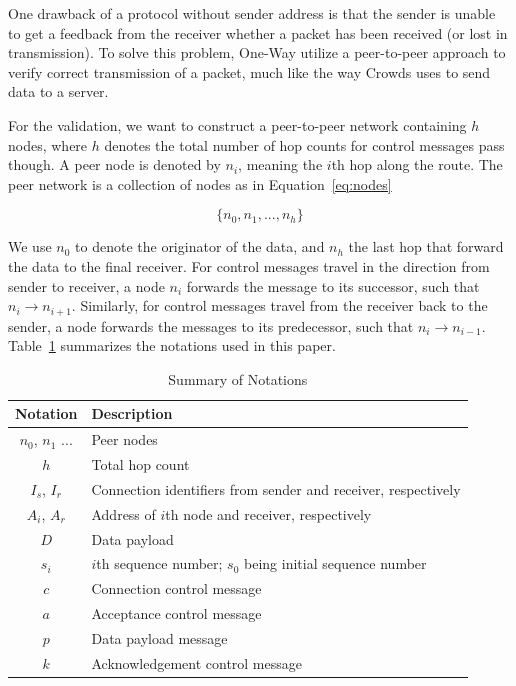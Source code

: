 One drawback of a protocol without sender address is that the sender is unable
to get a feedback from the receiver whether a packet has been received (or
lost in transmission). To solve this problem, One-Way utilize a peer-to-peer
approach to verify correct transmission of a packet, much like the way
Crowds\cite{DBLP:journals/tissec/ReiterR98} uses to send data to a server.

For the validation, we want to construct a peer-to-peer network containing
$h$ nodes, where $h$ denotes the total number of hop counts for control
messages pass though. A peer node is denoted by $n_i$, meaning the
$i$th hop along the route. The peer network is a collection of nodes as
in Equation~\ref{eq:nodes}

\begin{equation}\label{eq:nodes}
\{n_0, n_1, ..., n_h\}
\end{equation}

We use $n_0$ to denote the originator of the data, and $n_h$ the last hop
that forward the data to the final receiver. For control messages travel
in the direction from sender to receiver, a node $n_i$ forwards the message
to its successor, such that $n_i \rightarrow n_{i+1}$. Similarly, for
control messages travel from the receiver back to the sender, a node 
forwards the messages to its predecessor, such that
$n_{i} \rightarrow n_{i-1}$. Table~\ref{tab:notations} summarizes the
notations used in this paper.

\begin{table}[h]
\centering
\caption{Summary of Notations} \label{tab:notations}
\begin{tabular}{c|l}
\hline
{\bf Notation} & {\bf Description}\\
\hline
$n_0$, $n_1$ ... & Peer nodes\\
$h$ & Total hop count\\
$I_s$, $I_r$ & Connection identifiers from sender and receiver, respectively\\
$A_i$, $A_r$ & Address of $i$th node and receiver, respectively\\
$D$ & Data payload\\
$s_i$ & $i$th sequence number; $s_0$ being initial sequence number\\
$c$ & Connection control message\\
$a$ & Acceptance control message\\
$p$ & Data payload message\\
$k$ & Acknowledgement control message\\
\hline
\end{tabular}
\end{table}

